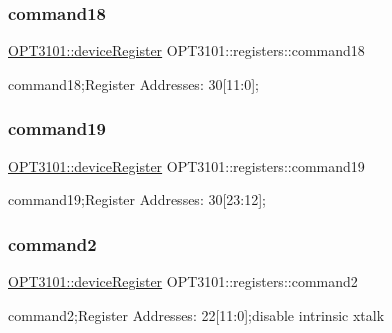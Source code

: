 \subsubsection{\texorpdfstring{command18}{command18}}
{\footnotesize\ttfamily \mbox{\hyperlink{class_o_p_t3101_1_1device_register}{O\+P\+T3101\+::device\+Register}} O\+P\+T3101\+::registers\+::command18}



command18;Register Addresses\+: 30\mbox{[}11\+:0\mbox{]}; 

\mbox{\label{class_o_p_t3101_1_1registers_ac78d7ff66db69a0ae173890e9e777b2f}} 
\subsubsection{\texorpdfstring{command19}{command19}}
{\footnotesize\ttfamily \mbox{\hyperlink{class_o_p_t3101_1_1device_register}{O\+P\+T3101\+::device\+Register}} O\+P\+T3101\+::registers\+::command19}



command19;Register Addresses\+: 30\mbox{[}23\+:12\mbox{]}; 

\mbox{\label{class_o_p_t3101_1_1registers_aed26bc378310752c75ab2a494d349a7e}} 
\subsubsection{\texorpdfstring{command2}{command2}}
{\footnotesize\ttfamily \mbox{\hyperlink{class_o_p_t3101_1_1device_register}{O\+P\+T3101\+::device\+Register}} O\+P\+T3101\+::registers\+::command2}



command2;Register Addresses\+: 22\mbox{[}11\+:0\mbox{]};disable intrinsic xtalk 

\mbox{\label{class_o_p_t3101_1_1registers_a89699ece57124e83677abb74fc6e12ed}} 
